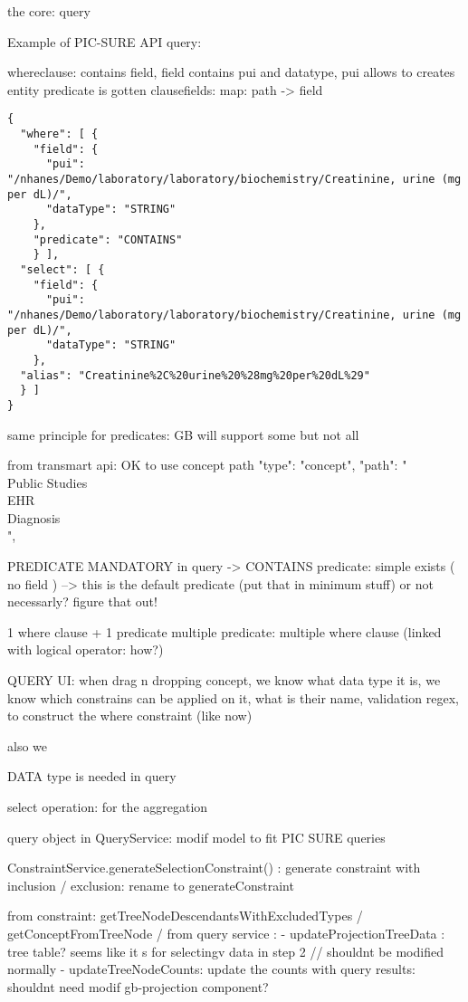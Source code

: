 the core: query

Example of PIC-SURE API query:

whereclause:
contains field, field contains pui and datatype, pui allows to creates entity
predicate is gotten
clausefields: map: path -> field

\begin{verbatim}
{
  "where": [ {
    "field": {
      "pui": "/nhanes/Demo/laboratory/laboratory/biochemistry/Creatinine, urine (mg per dL)/", 
      "dataType": "STRING"
    },
    "predicate": "CONTAINS"
    } ],
  "select": [ {
    "field": {
      "pui": "/nhanes/Demo/laboratory/laboratory/biochemistry/Creatinine, urine (mg per dL)/",
      "dataType": "STRING"
    },
  "alias": "Creatinine%2C%20urine%20%28mg%20per%20dL%29"
  } ]
}
\end{verbatim}

same principle for predicates: GB will support some but not all 

from transmart api: OK to use concept path
 "type": "concept",
                "path": "\\Public Studies\\EHR\\Diagnosis\\",

PREDICATE MANDATORY in query
-> CONTAINS predicate: simple exists ( no field ) --> this is the default predicate (put that in minimum stuff) or not necessarly? figure that out!



1 where clause + 1 predicate
multiple predicate: multiple where clause (linked with logical operator: how?)

QUERY UI:
when drag n dropping concept, we know what data type it is, we know which constrains can be applied on it, what is their name, validation regex, to construct the where constraint (like now)

also we 

DATA type is needed in query

select operation: for the aggregation

query object in QueryService: modif model to fit PIC SURE queries

ConstraintService.generateSelectionConstraint() : generate constraint with inclusion / exclusion: rename to generateConstraint


from constraint: getTreeNodeDescendantsWithExcludedTypes / getConceptFromTreeNode / 
from query service : 
- updateProjectionTreeData : tree table? seems like it s for selectingv data in step 2 // shouldnt be modified normally
- updateTreeNodeCounts: update the counts with query results: shouldnt need modif
gb-projection component?



